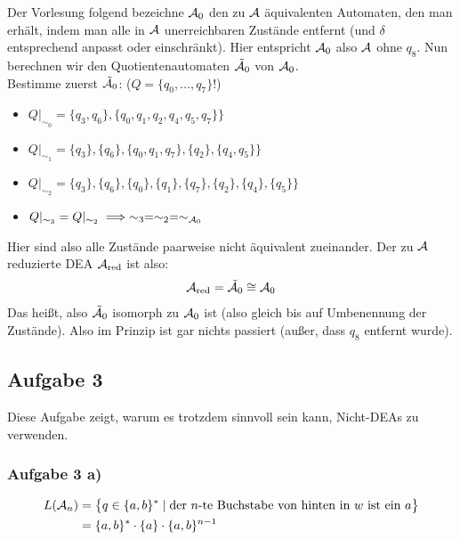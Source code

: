Der Vorlesung folgend bezeichne $\mathcal{A}_0$ den zu $\mathcal{A}$ äquivalenten Automaten, den man erhält, indem man alle in $\mathcal{A}$ unerreichbaren Zustände entfernt (und $\delta$ entsprechend anpasst oder einschränkt). 
Hier entspricht $\mathcal{A}_0$ also $\mathcal{A}$ ohne $q_8$.\nl
Nun berechnen wir den Quotientenautomaten $\tilde{\mathcal{A}}_0$ von $\mathcal{A}_0$.\\
Bestimme zuerst $\tilde{\mathcal{A}}_0$: ($Q=\lbrace q_0,\ldots,q_7\rbrace$!)
\begin{itemize}
	\item $Q|_{\sim_0}=\big\lbrace q_3,q_6\rbrace,\lbrace q_0,q_1,q_2,q_4,q_5,q_7\rbrace\big\rbrace$
	\item $Q|_{\sim_1}=\big\lbrace q_3\rbrace,\lbrace q_6\rbrace,\lbrace q_0,q_1,q_7\rbrace,\lbrace q_2\rbrace,\lbrace q_4,q_5\rbrace\big\rbrace$
	\item $Q|_{\sim_2}=\big\lbrace q_3\rbrace,\lbrace q_6\rbrace,\lbrace q_0\rbrace,\lbrace q_1\rbrace,\lbrace q_7\rbrace,\lbrace q_2\rbrace,\lbrace q_4\rbrace,\lbrace q_5\rbrace\big\rbrace$
	\item $Q|_{\sim_3}=Q|_{\sim_2}\implies\sim_3=\sim_2=\sim_{\mathcal{A}_0}$
\end{itemize}
Hier sind also alle Zustände paarweise nicht äquivalent zueinander. 
Der zu $\mathcal{A}$ reduzierte DEA $\mathcal{A}_{\text{red}}$ ist also:
\begin{align*}
	\mathcal{A}_{\text{red}}=\tilde{\mathcal{A}}_0\cong\mathcal{A}_0
\end{align*}
Das heißt, also $\tilde{\mathcal{A}}_0$ isomorph zu $\mathcal{A}_0$ ist (also gleich bis auf Umbenennung der Zustände). Also im Prinzip ist gar nichts passiert (außer, dass $q_8$ entfernt wurde).

\subsection{Aufgabe 3}
Diese Aufgabe zeigt, warum es trotzdem sinnvoll sein kann, Nicht-DEAs zu verwenden.

\subsubsection{Aufgabe 3 a)}
\begin{align*}
	L(\mathcal{A}_n)
	&=\big\lbrace q\in\lbrace a,b\rbrace^\ast\mid\text{der $n$-te Buchstabe von hinten in $w$ ist ein }a\big\rbrace\\
	&=\lbrace a,b\rbrace^\ast\cdot\lbrace a\rbrace\cdot\lbrace a,b\rbrace^{n-1}
\end{align*}

